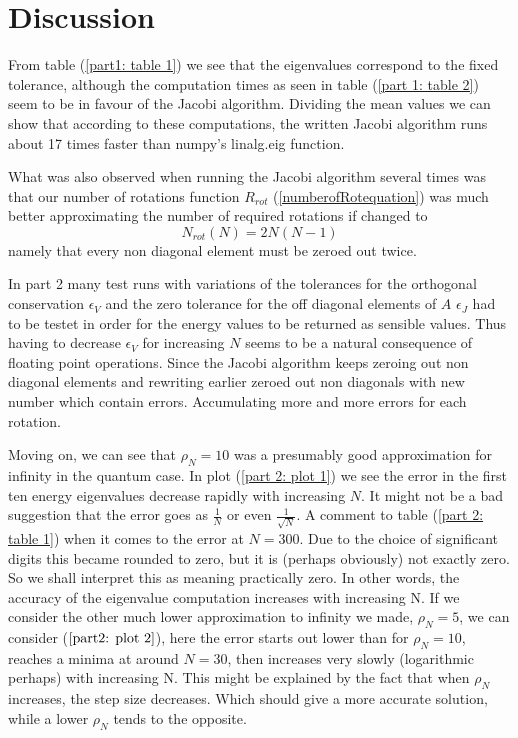 \documentclass[aip,nobalancelastpage,
twocolumn,
rsi,%
 amsmath,amssymb,
 reprint,%
]{revtex4}
\begin{document}
\section{Discussion}
From table (\ref{part1: table 1}) we see that the eigenvalues correspond to the fixed tolerance, although the computation times as seen in table (\ref{part 1: table 2}) seem to be in favour of the Jacobi algorithm. Dividing the mean values we can show that according to these computations, the written Jacobi algorithm runs about 17 times faster than numpy's linalg.eig function.\par
What was also observed when running the Jacobi algorithm several times was that our number of rotations function $R_{rot}$ (\ref{numberofRotequation}) was much better approximating the number of required rotations if changed to
\begin{equation}
N_{rot}(N)=2 N(N-1)
\end{equation}
namely that every non diagonal element must be zeroed out twice.\par
In part 2 many test runs with variations of the tolerances for the orthogonal conservation $\epsilon_V$ and the zero tolerance for the off diagonal elements of $A$ $\epsilon_J$ had to be testet in order for the energy values to be returned as sensible values. Thus having to decrease $\epsilon_V$ for increasing $N$ seems to be a natural consequence of floating point operations. Since the Jacobi algorithm keeps zeroing out non diagonal elements and rewriting earlier zeroed out non diagonals with new number which contain errors. Accumulating more and more errors for each rotation. \par
Moving on, we can see that $\rho_N=10$ was a presumably good approximation for infinity in the quantum case. In plot (\ref{part 2: plot 1}) we see the error in the first ten energy eigenvalues decrease rapidly with increasing $N$. It might not be a bad suggestion that the error goes as $\frac{1}{N}$ or even $\frac{1}{\sqrt{N}}$. A comment to table (\ref{part 2: table 1}) when it comes to the error at $N=300$. Due to the choice of significant digits this became rounded to zero, but it is (perhaps obviously) not exactly zero. So we shall interpret this as meaning practically zero. In other words, the accuracy of the eigenvalue computation increases with increasing N. If we consider the other much lower approximation to infinity we made, $\rho_N=5$, we can consider ($\ref{part2: plot 2}$), here the error starts out lower than for $\rho_N=10$, reaches a minima at around $N=30$, then increases very slowly (logarithmic perhaps) with increasing N. This might be explained by the fact that when $\rho_N$ increases, the step size decreases. Which should give a more accurate solution, while a lower $\rho_N$ tends to the opposite.\par
\end{document}
